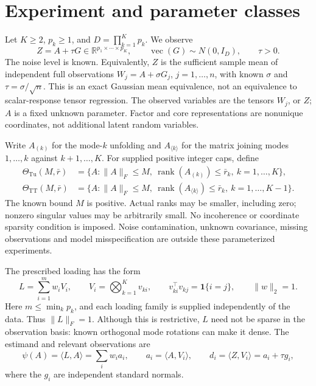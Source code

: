 \documentclass[11pt]{article}
\theoremstyle{remark}
\newcommand{\R}{\mathbb R}
\newcommand{\ip}[2]{\langle #1,#2\rangle}
\newcommand{\norm}[1]{\lVert #1\rVert}
\newcommand{\rank}{\operatorname{rank}}
\newcommand{\Tu}{\mathrm{Tu}}
\newcommand{\TT}{\mathrm{TT}}
\begin{document}
\section{Experiment and parameter classes}\label{sec:model}

Let $K\ge2$, $p_k\ge1$, and $D=\prod_{k=1}^K p_k$. We observe
\begin{equation}\label{eq:model}
 Z=A+\tau G\in\R^{p_1\times\cdots\times p_K},\qquad
 \operatorname{vec}(G)\sim N(0,I_D),\qquad \tau>0.
\end{equation}
The noise level is known. Equivalently, $Z$ is the sufficient sample mean of independent full observations $W_j=A+\sigma G_j$, $j=1,\ldots,n$, with known $\sigma$ and $\tau=\sigma/\sqrt n$. This is an exact Gaussian mean equivalence, not an equivalence to scalar-response tensor regression. The observed variables are the tensors $W_j$, or $Z$; $A$ is a fixed unknown parameter. Factor and core representations are nonunique coordinates, not additional latent random variables.

Write $A_{(k)}$ for the mode-$k$ unfolding and $A_{\langle k\rangle}$ for the matrix joining modes $1,\ldots,k$ against $k+1,\ldots,K$. For supplied positive integer caps, define
\begin{align}
 \Theta_{\Tu}(M,\bar r)&=\{A:\norm A_F\le M,\ \rank(A_{(k)})\le\bar r_k,\ k=1,\ldots,K\},\label{eq:tucker}\\
 \Theta_{\TT}(M,\bar r)&=\{A:\norm A_F\le M,\ \rank(A_{\langle k\rangle})\le\bar r_k,\ k=1,\ldots,K-1\}.\label{eq:tt}
\end{align}
The known bound $M$ is positive. Actual ranks may be smaller, including zero; nonzero singular values may be arbitrarily small. No incoherence or coordinate sparsity condition is imposed. Noise contamination, unknown covariance, missing observations and model misspecification are outside these parameterized experiments.

The prescribed loading has the form
\begin{equation}\label{eq:loading}
 L=\sum_{i=1}^m w_i V_i,\qquad
 V_i=\bigotimes_{k=1}^K v_{ki},\qquad
 v_{ki}^\top v_{kj}=\mathbf1\{i=j\},\qquad \norm w_2=1.
\end{equation}
Here $m\le\min_k p_k$, and each loading family is supplied independently of the data. Thus $\norm L_F=1$. Although this is restrictive, $L$ need not be sparse in the observation basis: known orthogonal mode rotations can make it dense. The estimand and relevant observations are
\begin{equation}\label{eq:diagonal}
 \psi(A)=\ip LA=\sum_iw_i a_i,\qquad
 a_i=\ip A{V_i},\qquad d_i=\ip Z{V_i}=a_i+\tau g_i,
\end{equation}
where the $g_i$ are independent standard normals.
\end{document}
